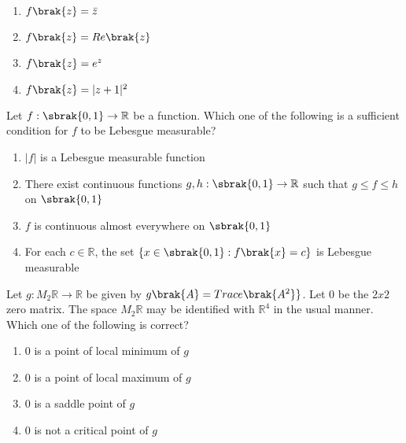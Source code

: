     \begin{enumerate}
        \item $f\brak{z}=\Bar{z}$
        \item $f\brak{z}=Re\brak{z}$
        \item $f\brak{z}=e^z$ 
        \item $f\brak{z}=|z+1|^2$
    \end{enumerate}
    \item Let $f:\sbrak{0,1}\rightarrow\mathbb{R}$ be a function. Which one of the following is a sufficient condition for $f$ to be Lebesgue measurable?
    \begin{enumerate}
        \item $|f|$ is a Lebesgue measurable function
        \item There exist continuous functions $g,h:\sbrak{0,1}\rightarrow\mathbb{R}$ such that $g\leq f\leq h$ on $\sbrak{0,1}$
        \item $f$ is continuous almost everywhere on $\sbrak{0,1}$
        \item For each $c\in\mathbb{R}$, the set $\{x\in\sbrak{0,1}:f\brak{x}=c\}$ is Lebesgue measurable
         \end{enumerate}
        \item Let $g: M_2\mathbb{R}\rightarrow\mathbb{R}$ be given by $g\brak{A}= Trace\brak{A^2}\}$. Let $0$ be the $2x2$ zero matrix. The space $M_2\mathbb{R}$ may be identified with $\mathbb{R}^4$ in the usual manner. Which one of the following is correct?
\begin{enumerate}
    \item $0$ is a point of local minimum of $g$
    \item $0$ is a point of local maximum of $g$
    \item $0$ is a saddle point of $g$
    \item $0$ is not a critical point of $g$
\end{enumerate}




